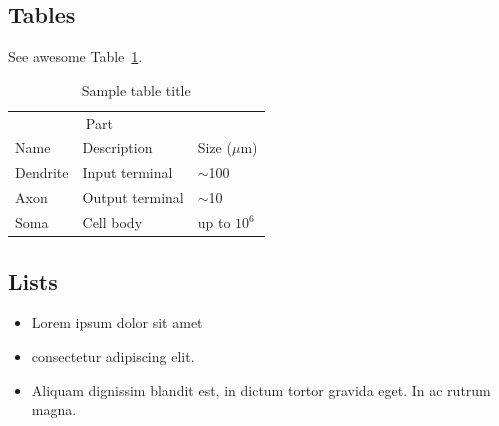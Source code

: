 \documentclass{article}
\begin{document}
\subsection{Tables}

See awesome Table~\ref{tab:table}.

\begin{table}
 \caption{Sample table title}
  \centering
  \begin{tabular}{lll}
    \toprule
    \multicolumn{2}{c}{Part}                   \\
    \cmidrule(r){1-2}
    Name     & Description     & Size ($\mu$m) \\
    \midrule
    Dendrite & Input terminal  & $\sim$100     \\
    Axon     & Output terminal & $\sim$10      \\
    Soma     & Cell body       & up to $10^6$  \\
    \bottomrule
  \end{tabular}
  \label{tab:table}
\end{table}

\subsection{Lists}
\begin{itemize}
\item Lorem ipsum dolor sit amet
\item consectetur adipiscing elit. 
\item Aliquam dignissim blandit est, in dictum tortor gravida eget. In ac rutrum magna.
\end{itemize}


%  
 
  

\end{document}
